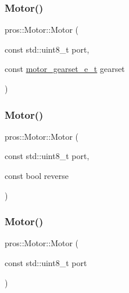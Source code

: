 \mbox{\label{classpros_1_1Motor_aff27ad42b72a59c35e36a665bcd763a6}} 
\subsubsection{\texorpdfstring{Motor()}{Motor()}\hspace{0.1cm}{\footnotesize\ttfamily [3/5]}}
{\footnotesize\ttfamily pros\+::\+Motor\+::\+Motor (\begin{DoxyParamCaption}\item[{const std\+::uint8\+\_\+t}]{port,  }\item[{const \hyperlink{motors_8h_aa2f1c305c998abc3bf8dd1f76fa4da8b}{motor\+\_\+gearset\+\_\+e\+\_\+t}}]{gearset }\end{DoxyParamCaption})\hspace{0.3cm}{\ttfamily [explicit]}}

\mbox{\label{classpros_1_1Motor_a822e0023951996ca7eff13ffe9cf953d}} 
\subsubsection{\texorpdfstring{Motor()}{Motor()}\hspace{0.1cm}{\footnotesize\ttfamily [4/5]}}
{\footnotesize\ttfamily pros\+::\+Motor\+::\+Motor (\begin{DoxyParamCaption}\item[{const std\+::uint8\+\_\+t}]{port,  }\item[{const bool}]{reverse }\end{DoxyParamCaption})\hspace{0.3cm}{\ttfamily [explicit]}}

\mbox{\label{classpros_1_1Motor_a767b4ad39251b8e8411fae17a35b24ba}} 
\subsubsection{\texorpdfstring{Motor()}{Motor()}\hspace{0.1cm}{\footnotesize\ttfamily [5/5]}}
{\footnotesize\ttfamily pros\+::\+Motor\+::\+Motor (\begin{DoxyParamCaption}\item[{const std\+::uint8\+\_\+t}]{port }\end{DoxyParamCaption})\hspace{0.3cm}{\ttfamily [explicit]}}



